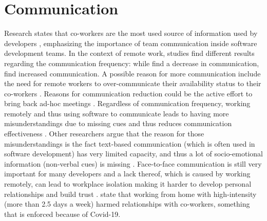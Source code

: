 \section{Communication}
Research states that co-workers are the most used source of information used by developers \autocite{ko2007information}, emphasizing the importance of team communication inside software development teams. In the context of remote work, studies find different results regarding the communication frequency: while \textcite{kraut1988patterns, allen1984managing} find a decrease in communication, \textcite{mulki2009set} find increased communication. A possible reason for more communication include the need for remote workers to over-communicate their availability status to their co-workers \autocite{koehne2012remote}. Reasons for communication reduction could be the active effort to bring back ad-hoc meetings \autocite{miller2021your}. Regardless of communication frequency, working remotely and thus using software to communicate leads to having more misunderstandings due to missing cues and thus reduces communication effectiveness \autocite{mulki2009set}. Other researchers argue that the reason for those misunderstandings is the fact text-based communication (which is often used in software development) has very limited capacity, and thus a lot of socio-emotional information (non-verbal cues) is missing \autocite{hassib2017heartchat}. Face-to-face communication is still very important for many developers \autocite{storey2016social} and a lack thereof, which is caused by working remotely, can lead to workplace isolation making it harder to develop personal relationships and build trust \autocite{mulki2009set}. \textcite{gajendran2007good} state that working from home with high-intensity (more than 2.5 days a week) harmed relationships with co-workers, something that is enforced because of Covid-19.




